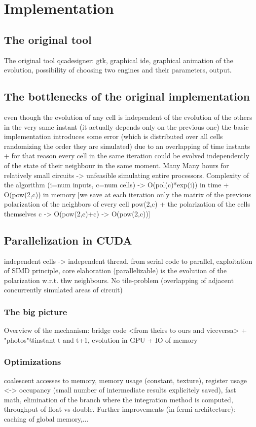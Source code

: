 \chapter{Implementation}\label{sec:implementation}
\section {The original tool}
The original tool
qcadesigner: gtk, graphical ide, graphical animation of the evolution, possibility of choosing two engines and their parameters, output.
\section {The bottlenecks of the original implementation}
even though the evolution of any cell is independent of the evolution of the others  in the very same instant  (it actually depends only on the previous one) the basic implementation introduces some error (which is distributed over all cells randomizing the order they are simulated) due to an overlapping of time instants + for that reason every cell in the same iteration could be evolved  independently  of the state of their neighbour in the same moment. Many Many hours for relatively small circuits -> unfeasible simulating entire processors. Complexity of the algorithm (i=num inputs, c=num cells) -> O(pol(c)*exp(i)) in time + O(pow(2,c)) in memory [we save at each iteration only the matrix of the previous polarization of the neighbors of every cell {pow(2,c)} + the polarization of the cells themselves {c} -> O(pow(2,c)+c) -> O(pow(2,c))]
\section {Parallelization in CUDA}
independent cells -> independent thread, from serial code to parallel, exploitation of SIMD principle, core elaboration (parallelizable) is the evolution of the polarization w.r.t. thw neighbours. No tile-problem (overlapping of adjacent concurrently simulated areas of circuit)
\subsection{The big picture}
Overview of the mechanism: bridge code <from theirs to ours and viceversa> + "photos"@instant t and t+1, evolution in GPU + IO of memory
\subsection{Optimizations}
coalescent accesses to memory, memory usage (constant, texture), register usage <-> occupancy (small number of intermediate results explicitely saved), fast math, elimination of the branch where the integration method is computed, throughput of float vs double. Further improvements (in fermi architecture): caching of global memory,...
